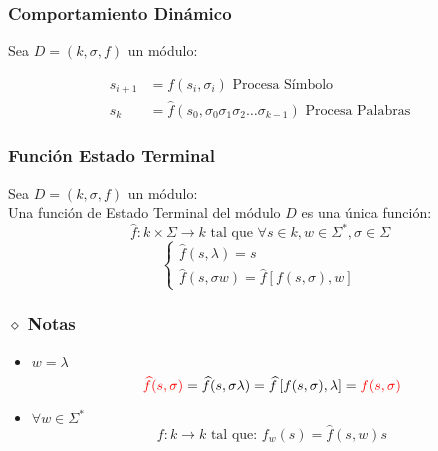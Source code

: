 \subsubsection{Comportamiento Dinámico}
Sea $D=(k,\sigma,f)$ un módulo: \\
\begin{center}
\end{center}

\begin{align*}
s_{i+1} &= f(s_i, \sigma_i ) \text{ Procesa Símbolo}\\
s_{k  } &= \hat{f}(s_0, \sigma_0\sigma_1\sigma_2 \ldots \sigma_{k-1} ) \text{ Procesa Palabras}
\end{align*}

\subsubsection{Función Estado Terminal}
Sea $D=(k,\sigma,f)$ un módulo: \\${ }$\\
Una función de Estado Terminal del módulo $D$ es una única función:
$$
\widehat{f}:k\times\Sigma \rightarrow k \text{ tal que } \forall s\in k, w\in\Sigma^* , \sigma\in\Sigma
$$
$$
\begin{cases}
\widehat{f}(s,\lambda)=s \\
\widehat{f}(s,\sigma w)= \widehat{f}\left[ f(s,\sigma),w\right]
\end{cases}
$$
\subsubsection{$\diamond$ Notas}
\begin{itemize}
\item $w=\lambda$
$$
{\color{red}\widehat{f}(s,\sigma)}=\widehat{f}(s,\sigma\lambda)=\widehat{f}\left[ f(s,\sigma),\lambda\right]={\color{red}f(s,\sigma)}
$$
\item $\forall w\in\Sigma^*$
$$
f:k \rightarrow k \text{ tal que: } f_w(s)=\widehat{f}(s,w)
s
$$
\end{itemize}
